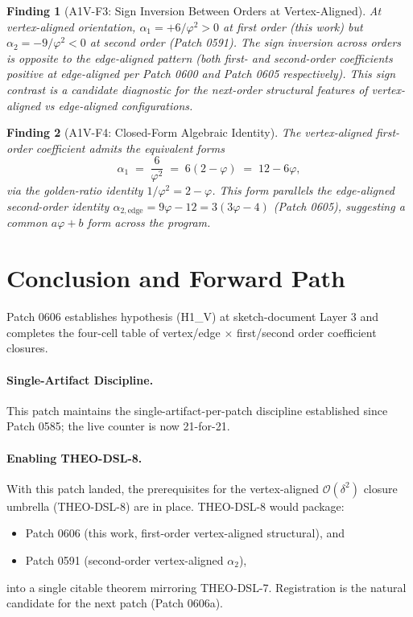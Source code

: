 \documentclass[11pt]{article}
\newtheorem{finding}{Finding}
\begin{document}
\begin{finding}[A1V-F3: Sign Inversion Between Orders at Vertex-Aligned]\label{find:A1V-F3}
At vertex-aligned orientation, $\alpha_1 = +6/\varphi^2 > 0$ at first
order (this work) but $\alpha_2 = -9/\varphi^2 < 0$ at second order
(Patch 0591). The sign inversion across orders is opposite to the
edge-aligned pattern (both first- and second-order coefficients positive
at edge-aligned per Patch 0600 and Patch 0605 respectively). This sign
contrast is a candidate diagnostic for the next-order structural
features of vertex-aligned vs edge-aligned configurations.
\end{finding}

\begin{finding}[A1V-F4: Closed-Form Algebraic Identity]\label{find:A1V-F4}
The vertex-aligned first-order coefficient admits the equivalent forms
\[
\alpha_1 \;=\; \frac{6}{\varphi^2} \;=\; 6(2-\varphi) \;=\; 12 - 6\varphi,
\]
via the golden-ratio identity $1/\varphi^2 = 2 - \varphi$. This form
parallels the edge-aligned second-order identity
$\alpha_{2,\text{edge}} = 9\varphi - 12 = 3(3\varphi - 4)$
(Patch 0605), suggesting a common $a\varphi + b$ form across the program.
\end{finding}

\section{Conclusion and Forward Path}

Patch 0606 establishes hypothesis (H1\_V) at sketch-document Layer 3
and completes the four-cell table of vertex/edge $\times$ first/second
order coefficient closures.

\paragraph{Single-Artifact Discipline.}
This patch maintains the single-artifact-per-patch discipline established
since Patch 0585; the live counter is now 21-for-21.

\paragraph{Enabling THEO-DSL-8.}
With this patch landed, the prerequisites for the vertex-aligned
$\mathcal{O}(\delta^2)$ closure umbrella (THEO-DSL-8) are in place.
THEO-DSL-8 would package:
\begin{itemize}
\item Patch 0606 (this work, first-order vertex-aligned structural), and
\item Patch 0591 (second-order vertex-aligned $\alpha_2$),
\end{itemize}
into a single citable theorem mirroring THEO-DSL-7. Registration is the
natural candidate for the next patch (Patch 0606a).
\end{document}
